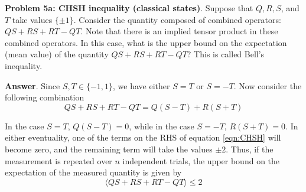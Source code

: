 \textbf{Problem 5a: CHSH inequality (classical states)}. Suppose that $Q, R, S$, and $T$ take values $\{\pm 1\}$. 
Consider the quantity composed of combined operators: $QS + RS + RT - QT$. 
Note that there is an implied tensor product in these combined operators.
In this case, what is the upper bound on the expectation (mean value) of the quantity $QS + RS + RT - QT$? 
This is called Bell's inequality.

\textbf{Answer}. Since $S, T \in \{-1, 1\}$, we have either $S=T$ or $S=-T$.
Now consider the following combination
\begin{equation}
	\label{eqn:CHSH}
	QS + RS + RT - QT = Q(S - T) + R(S + T)
\end{equation}

In the case $S=T$, $Q(S - T) =0$, while in the case $S=-T$, $R(S + T) =0$.
In either eventuality, one of the terms on the RHS of equation \ref{eqn:CHSH} will become zero, and the remaining term will take the values $\pm2$.
Thus, if the measurement is repeated over $n$ independent trials, the upper bound on the expectation of the measured quantity is given by
\begin{equation*}
	\langle QS + RS + RT - QT \rangle \leq 2
\end{equation*}




